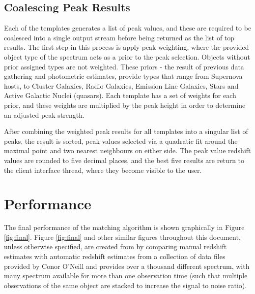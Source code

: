 \documentclass[titlesmallcaps, examinerscopy, copyrightpage]{uqthesis}
\begin{document}
\subsection{Coalescing Peak Results}

Each of the templates generates a list of peak values, and these are required to be coalesced into a single output stream before being returned as the list of top results. The first step in this process is apply peak weighting, where the provided object type of the spectrum acts as a prior to the peak selection. Objects without prior assigned types are not weighted. These priors - the result of previous data gathering and photometric estimates, provide types that range from Supernova hosts, to Cluster Galaxies, Radio Galaxies, Emission Line Galaxies, Stars and Active Galactic Nuclei (quasars). Each template has a set of weights for each prior, and these weights are multiplied by the peak height in order to determine an adjusted peak strength.

After combining the weighted peak results for all templates into a singular list of peaks, the result is sorted, peak values selected via a quadratic fit around the maximal point and two nearest neighbours on either side. The peak value redshift values are rounded to five decimal places, and the best five results are return to the client interface thread, where they become visible to the user.







\section{Performance} \label{sec:performance}

The final performance of the matching algorithm is shown graphically in Figure \ref{fig:final}. Figure \ref{fig:final} and other similar figures throughout this document, unless otherwise specified, are created from by comparing manual redshift estimates with automatic redshift estimates from a collection of data files provided by Conor O'Neill and provides over a thousand different spectrum, with many spectrum available for more than one observation time (such that multiple observations of the same object are stacked to increase the signal to noise ratio). 
\end{document}
